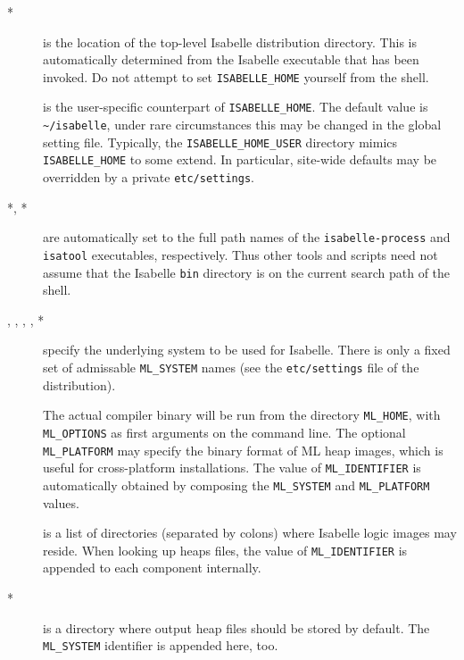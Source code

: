 \begin{description}
\item[*] is the location of the top-level Isabelle
  distribution directory. This is automatically determined from the Isabelle
  executable that has been invoked.  Do not attempt to set
  \texttt{ISABELLE_HOME} yourself from the shell.
  
\item[] is the user-specific counterpart of
  \texttt{ISABELLE_HOME}. The default value is \texttt{\~\relax/isabelle},
  under rare circumstances this may be changed in the global setting file.
  Typically, the \texttt{ISABELLE_HOME_USER} directory mimics
  \texttt{ISABELLE_HOME} to some extend. In particular, site-wide defaults may
  be overridden by a private \texttt{etc/settings}.
  
\item[*, *] are automatically set to the full
  path names of the \texttt{isabelle-process} and \texttt{isatool}
  executables, respectively.  Thus other tools and scripts need not assume
  that the Isabelle \texttt{bin} directory is on the current search path of
  the shell.
  
\item[, , ,
  , *] specify the underlying {\ML}
  system to be used for Isabelle.  There is only a fixed set of admissable
  \texttt{ML_SYSTEM} names (see the \texttt{etc/settings} file of the
  distribution).
  
  The actual compiler binary will be run from the directory \texttt{ML_HOME},
  with \texttt{ML_OPTIONS} as first arguments on the command line.  The
  optional \texttt{ML_PLATFORM} may specify the binary format of ML heap
  images, which is useful for cross-platform installations.  The value of
  \texttt{ML_IDENTIFIER} is automatically obtained by composing the
  \texttt{ML_SYSTEM} and \texttt{ML_PLATFORM} values.
  
\item[] is a list of directories (separated by colons)
  where Isabelle logic images may reside.  When looking up heaps files, the
  value of \texttt{ML_IDENTIFIER} is appended to each component internally.
  
\item[*] is a directory where output heap files should
  be stored by default. The \texttt{ML_SYSTEM} identifier is appended here,
  too.
  

\end{description}
